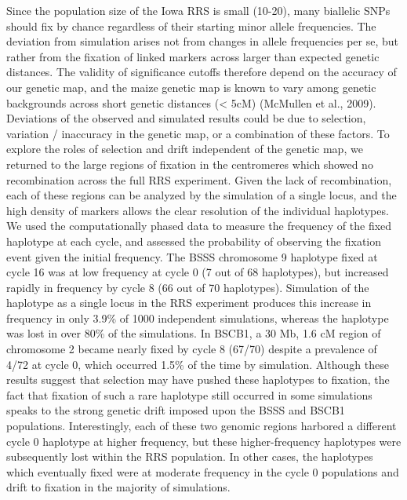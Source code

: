 Since the population size of the Iowa RRS is small (10-20), many biallelic SNPs should fix by chance regardless of their starting minor allele frequencies. The deviation from simulation arises not from changes in allele frequencies per se, but rather from the fixation of linked markers across larger than expected genetic distances. The validity of significance cutoffs therefore depend on the accuracy of our genetic map, and the maize genetic map is known to vary among genetic backgrounds across short genetic distances (< 5cM) (McMullen et al., 2009).  Deviations of the observed and simulated results could be due to selection, variation / inaccuracy in the genetic map, or a combination of these factors. 
To explore the roles of selection and drift independent of the genetic map, we returned to the large regions of fixation in the centromeres which showed no recombination across the full RRS experiment. Given the lack of recombination, each of these regions can be analyzed by the simulation of a single locus, and the high density of markers allows the clear resolution of the individual haplotypes. We used the computationally phased data to measure the frequency of the fixed haplotype at each cycle, and assessed the probability of observing the fixation event given the initial frequency. The BSSS chromosome 9 haplotype fixed at cycle 16 was at low frequency at cycle 0 (7 out of 68 haplotypes), but increased rapidly in frequency by cycle 8 (66 out of 70 haplotypes). Simulation of the haplotype as a single locus in the RRS experiment produces this increase in frequency in only 3.9\% of 1000 independent simulations, whereas the haplotype was lost in over 80\% of the simulations. In BSCB1, a 30 Mb, 1.6 cM region of chromosome 2 became nearly fixed by cycle 8 (67/70) despite a prevalence of 4/72 at cycle 0, which occurred 1.5\% of the time by simulation. Although these results suggest that selection may have pushed these haplotypes to fixation, the fact that fixation of such a rare haplotype still occurred in some simulations speaks to the strong genetic drift imposed upon the BSSS and BSCB1 populations. Interestingly, each of these two genomic regions harbored a different cycle 0 haplotype at higher frequency, but these higher-frequency haplotypes were subsequently lost within the RRS population. In other cases, the haplotypes which eventually fixed were at moderate frequency in the cycle 0 populations and drift to fixation in the majority of simulations.

